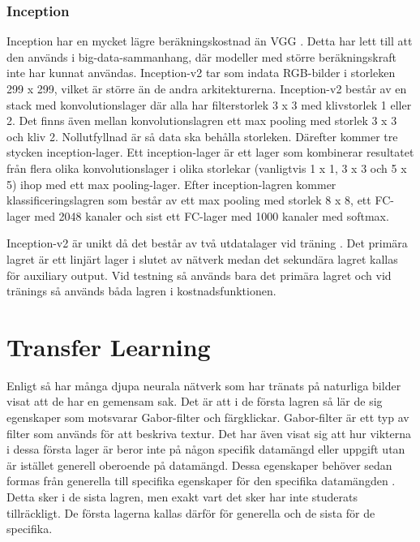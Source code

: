 \documentclass[]{kththesis}
\begin{document}
\subsubsection{Inception}
Inception har en mycket lägre beräkningskostnad än VGG \parencite{szegedy2016rethinking}. Detta har lett till att den används i big-data-sammanhang, där modeller med större beräkningskraft inte har kunnat användas. Inception-v2 tar som indata RGB-bilder i storleken 299 x 299, vilket är större än de andra arkitekturerna. Inception-v2 består av en stack med konvolutionslager där alla har filterstorlek 3 x 3 med klivstorlek 1 eller 2. Det finns även mellan konvolutionslagren ett max pooling med storlek 3 x 3 och kliv 2. Nollutfyllnad är så data ska behålla storleken. Därefter kommer tre stycken inception-lager. Ett inception-lager är ett lager som kombinerar resultatet från flera olika konvolutionslager i olika storlekar (vanligtvis 1 x 1, 3 x 3 och 5 x 5) ihop med ett max pooling-lager. Efter inception-lagren kommer klassificeringslagren som består av ett max pooling med storlek 8 x 8, ett FC-lager med 2048 kanaler och sist ett FC-lager med 1000 kanaler med softmax.

Inception-v2 är unikt då det består av två utdatalager vid träning \parencite{szegedy2016rethinking}. Det primära lagret är ett linjärt lager i slutet av nätverk medan det sekundära lagret kallas för auxiliary output. Vid testning så används bara det primära lagret och vid tränings så används båda lagren i kostnadsfunktionen.

\section{Transfer Learning}
Enligt \cite{yosinski2014transferable} så har många djupa neurala nätverk som har tränats på naturliga bilder visat att de har en gemensam sak. Det är att i de första lagren så lär de sig egenskaper som motsvarar Gabor-filter och färgklickar. Gabor-filter är ett typ av filter som används för att beskriva textur. Det har även visat sig att hur vikterna i dessa första lager är beror inte på någon specifik datamängd eller uppgift utan är istället generell oberoende på datamängd. Dessa egenskaper behöver sedan formas från generella till specifika egenskaper för den specifika datamängden \parencite{yosinski2014transferable}. Detta sker i de sista lagren, men exakt vart det sker har inte studerats tillräckligt. De första lagerna kallas därför för generella och de sista för de specifika.
\end{document}
